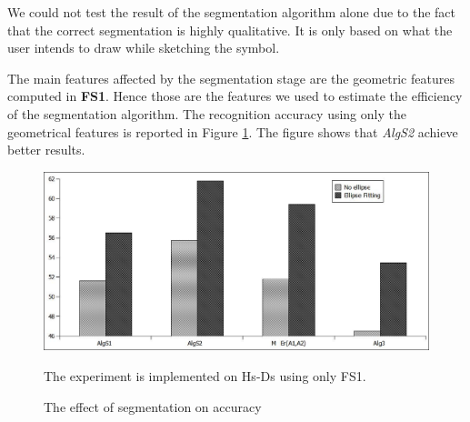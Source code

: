 \documentclass[preprint,10pt,5p,twocolumn]{elsarticle}
\begin{document}
 We could not test the result of the segmentation algorithm alone due to the fact that the correct segmentation is highly qualitative. It is only based on what the user intends to draw while sketching the symbol. 
 
 The main features affected by the segmentation stage are the geometric features computed in \textbf{FS1}. Hence those are the features we used to estimate the efficiency of the segmentation algorithm. The recognition accuracy using only the geometrical features is reported in Figure \ref{fig:testFeatonly}. The figure shows that \textsl{AlgS2} achieve better results.  
\begin{figure} 
	\centering
		\includegraphics[scale=0.45]{images/OnlyF1EL.jpg}
	\caption{The effect of segmentation on accuracy} The experiment is implemented on Hs-Ds using only FS1.  %
	\label{fig:testFeatonly}
\end{figure}  
\end{document}
